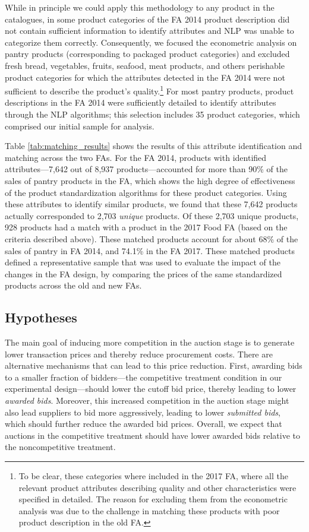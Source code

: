  {While in principle we could apply this methodology to any product in the catalogues, in some product categories of the FA 2014 product description did not contain sufficient information to identify attributes and NLP was unable to categorize them correctly. Consequently, we focused the econometric analysis on pantry products (corresponding to packaged product categories) and excluded fresh bread, vegetables, fruits, seafood, meat products, and others perishable product categories for which the attributes detected in the FA 2014 were not sufficient to describe the product's quality.\footnote{ To be clear, these categories where included in the 2017 FA, where all the relevant product attributes describing quality and other characteristics were specified in detailed. The reason for excluding them from the econometric analysis was due to the challenge in matching these products with poor product description in the old FA.} For most pantry products, product descriptions in the FA 2014 were sufficiently detailed to identify attributes through the NLP algorithms; this selection includes 35 product categories, which comprised our initial sample for analysis.}
 
 Table \ref{tab:matching_results} shows the results of this attribute identification and matching across the two FAs. For the FA 2014, products with identified attributes---7,642 out of 8,937 products---accounted for more than 90\% of the sales of {pantry products in the FA}, which shows the high degree of effectiveness of the product standardization algorithms  {for these product categories}. Using these attributes to identify similar products, we found that these 7,642 products actually corresponded to 2,703 \textit{unique} products. Of these 2,703 unique products, 928 products had a match with a product in the 2017 Food FA (based on the criteria described above). These matched products account for about 68\% of the sales of pantry in FA 2014, and 74.1\% in the FA 2017.  These matched products defined a representative sample that was used to evaluate the impact of the changes in the FA design, by comparing the prices of the same standardized products across the old and new FAs.
 
 
 
 
 \subsection{Hypotheses}
 
 The main goal of inducing more competition in the auction stage is to generate lower transaction prices and thereby reduce procurement costs. There are alternative mechanisms that can lead to this price reduction. First, awarding bids to a smaller fraction of bidders---the competitive treatment condition in our experimental design---should lower the cutoff bid price, thereby leading to lower \textit{awarded bids}. Moreover, this increased competition in the auction stage might also lead suppliers to bid more aggressively, leading to lower \textit{submitted bids}, which should further reduce the awarded bid prices. Overall, we expect that auctions in the competitive treatment should have lower awarded bids relative to the noncompetitive treatment.
 
